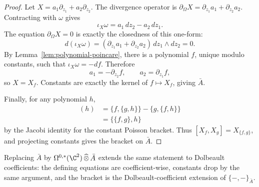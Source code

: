 \documentclass[11pt]{memoir}
\begin{document}
\begin{proof}
  Let $X=a_1\partial_{z_1}+a_2\partial_{z_2}$. The divergence operator is
  $\partial_{\Omega}X=\partial_{z_1}a_1+\partial_{z_2}a_2$. Contracting with
  $\omega$ gives
  $$\iota_X\omega=a_1\,dz_2-a_2\,dz_1.$$
  The equation $\partial_{\Omega}X=0$ is exactly the closedness of this
  one-form:
  $$d(\iota_X\omega)
    =(\partial_{z_1}a_1+\partial_{z_2}a_2)\,dz_1\wedge dz_2=0.$$
  By Lemma~\ref{lem:polynomial-poincare}, there is a polynomial $f$, unique
  modulo constants, such that $\iota_X\omega=-df$. Therefore
  $$a_1=-\partial_{z_2}f,\qquad a_2=\partial_{z_1}f,$$
  so $X=X_f$. Constants are exactly the kernel of $f\mapsto X_f$, giving
  $\bar A$.

  Finally, for any polynomial $h$,
  \begin{align*}
  [X_f,X_g](h)
    &=\{f,\{g,h\}\}-\{g,\{f,h\}\}\\
    &=\{\{f,g\},h\}
  \end{align*}
  by the Jacobi identity for the constant Poisson bracket. Thus
  $[X_f,X_g]=X_{\{f,g\}}$, and projecting constants gives the bracket on
  $\bar A$.
\end{proof}

Replacing $\bar A$ by
$\Omega^{0,*}(\C^2)\,\widehat\otimes\,\bar A$ extends the same statement
to Dolbeault coefficients: the defining equations are coefficient-wise,
constants drop by the same argument, and the bracket is the
Dolbeault-coefficient extension of $\{-,-\}_{\bar A}$.
\end{document}

